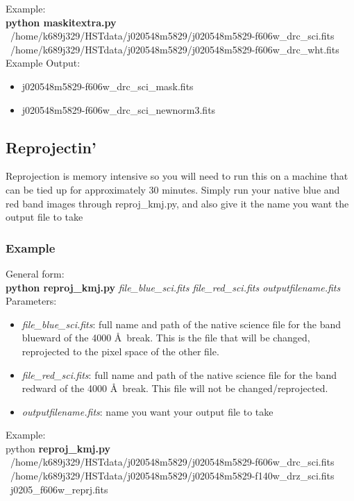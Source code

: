 \documentclass[a4paper,10pt]{article}
\begin{document}
\noindent Example:\\
\textbf{python maskitextra.py} \ /home/k689j329/HSTdata/j020548m5829/j020548m5829-f606w\_drc\_sci.fits \ /home/k689j329/HSTdata/j020548m5829/j020548m5829-f606w\_drc\_wht.fits \\

\noindent Example Output:
\begin{itemize}
    \setlength{\itemsep}{-5pt}
 \item j020548m5829-f606w\_drc\_sci\_mask.fits
 \item j020548m5829-f606w\_drc\_sci\_newnorm3.fits
\end{itemize}



\subsection{Reprojectin'}
Reprojection is memory intensive so you will need to run this on a machine that can be tied up for approximately 30 minutes. Simply run your native blue and red band images through reproj\_kmj.py, and also give it the name you want the output file to take
\subsubsection*{Example}
General form:\\
\textbf{python reproj\_kmj.py} \textit{file\_blue\_sci.fits file\_red\_sci.fits outputfilename.fits} \\

\noindent Parameters:
\begin{itemize}
\setlength{\itemsep}{-5pt}
 \item \textit{file\_blue\_sci.fits}: full name and path of the native science file for the band blueward of the 4000 \AA \ break. This is the file that will be changed, reprojected to the pixel space of the other file.
 \item \textit{file\_red\_sci.fits}: full name and path of the native science file for the band redward of the 4000 \AA \ break. This file will not be changed/reprojected.
 \item \textit{outputfilename.fits}: name you want your output file to take
\end{itemize}

\noindent Example: \\
python \textbf{reproj\_kmj.py} \ /home/k689j329/HSTdata/j020548m5829/j020548m5829-f606w\_drc\_sci.fits \  /home/k689j329/HSTdata/j020548m5829/j020548m5829-f140w\_drz\_sci.fits \ j0205\_f606w\_reprj.fits \\
\end{document}
